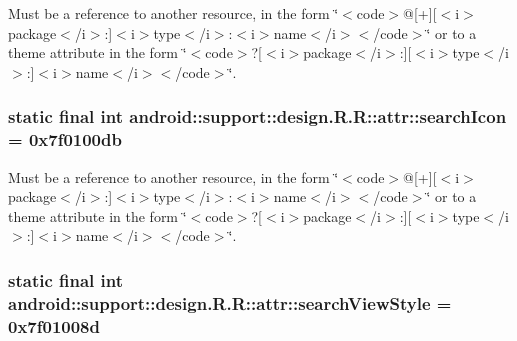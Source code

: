 Must be a reference to another resource, in the form \char`\"{}$<$code$>$@\mbox{[}+\mbox{]}\mbox{[}$<$i$>$package$<$/i$>$:\mbox{]}$<$i$>$type$<$/i$>$:$<$i$>$name$<$/i$>$$<$/code$>$\char`\"{} or to a theme attribute in the form \char`\"{}$<$code$>$?\mbox{[}$<$i$>$package$<$/i$>$:\mbox{]}\mbox{[}$<$i$>$type$<$/i$>$:\mbox{]}$<$i$>$name$<$/i$>$$<$/code$>$\char`\"{}. \hypertarget{classandroid_1_1support_1_1design_1_1_r_1_1attr_f6b43ff632b8dfc16f0008f3023db732}{
\subsubsection[{searchIcon}]{\setlength{\rightskip}{0pt plus 5cm}static final int android::support::design.R.R::attr::searchIcon = 0x7f0100db}}
\label{classandroid_1_1support_1_1design_1_1_r_1_1attr_f6b43ff632b8dfc16f0008f3023db732}


Must be a reference to another resource, in the form \char`\"{}$<$code$>$@\mbox{[}+\mbox{]}\mbox{[}$<$i$>$package$<$/i$>$:\mbox{]}$<$i$>$type$<$/i$>$:$<$i$>$name$<$/i$>$$<$/code$>$\char`\"{} or to a theme attribute in the form \char`\"{}$<$code$>$?\mbox{[}$<$i$>$package$<$/i$>$:\mbox{]}\mbox{[}$<$i$>$type$<$/i$>$:\mbox{]}$<$i$>$name$<$/i$>$$<$/code$>$\char`\"{}. \hypertarget{classandroid_1_1support_1_1design_1_1_r_1_1attr_4c3a2e969b5561be11063545dad783b2}{
\subsubsection[{searchViewStyle}]{\setlength{\rightskip}{0pt plus 5cm}static final int android::support::design.R.R::attr::searchViewStyle = 0x7f01008d}}
\label{classandroid_1_1support_1_1design_1_1_r_1_1attr_4c3a2e969b5561be11063545dad783b2}



